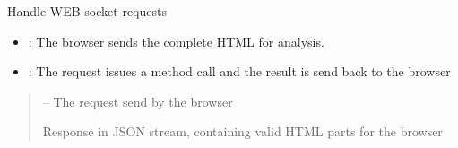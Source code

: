 \documentclass[letterpaper,10pt,english]{sphinxmanual}
\begin{document}
\begin{savenotes}
\begin{fulllineitems}
\begin{savenotes}\begin{fulllineitems}
\label{\detokenize{eezz:eezz.http_agent.THttpAgent.handle_request}}
\pysigstartsignatures
{}
\pysigstopsignatures
\sphinxAtStartPar
Handle WEB socket requests
\begin{itemize}
\item {} 
\sphinxAtStartPar
{}: The browser sends the complete HTML for analysis.

\item {} 
\sphinxAtStartPar
{}: The request issues a method call and the result is send back to the browser

\end{itemize}
\begin{quote}\begin{description}
\sphinxAtStartPar
{} – The request send by the browser

\sphinxAtStartPar
Response in JSON stream, containing valid HTML parts for the browser

\end{description}\end{quote}

\end{fulllineitems}\end{savenotes}


\begin{savenotes}\begin{fulllineitems}
\label{\detokenize{eezz:eezz.http_agent.THttpAgent.setup_download}}
\pysigstartsignatures
{}
\pysigstopsignatures
\end{fulllineitems}\end{savenotes}


\end{fulllineitems}\end{savenotes}
\end{document}
